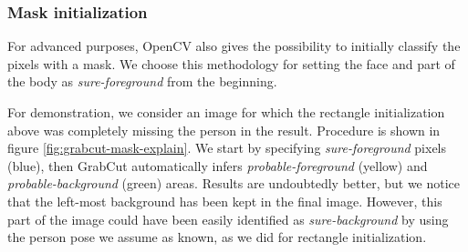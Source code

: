 \subsubsection{Mask initialization}
\label{subsec:masking-grabcut-mask}

For advanced purposes, OpenCV also gives the possibility to initially classify the pixels with a mask. We choose this methodology for setting the face and part of the body as \textit{sure-foreground} from the beginning.

For demonstration, we consider an image for which the rectangle initialization above was completely missing the person in the result. Procedure is shown in figure \ref{fig:grabcut-mask-explain}. We start by specifying \textit{sure-foreground} pixels (blue), then GrabCut automatically infers \textit{probable-foreground} (yellow) and \textit{probable-background} (green) areas. Results are undoubtedly better, but we notice that the left-most background has been kept in the final image. However, this part of the image could have been easily identified as \textit{sure-background} by using the person pose we assume as known, as we did for rectangle initialization.

